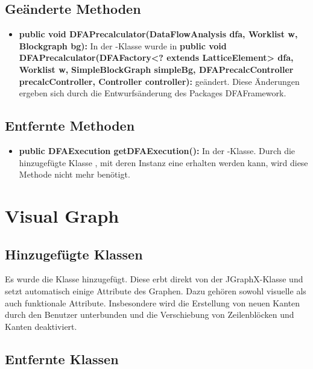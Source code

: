 \newpage
\subsection{Geänderte Methoden}

\begin{itemize}
	\item \textbf{public void DFAPrecalculator(DataFlowAnalysis dfa, Worklist w, Blockgraph bg):} In der -Klasse wurde in \textbf{public void DFAPrecalculator(DFAFactory<? extends LatticeElement> dfa, Worklist w, }\textbf{SimpleBlockGraph simpleBg, DFAPrecalcController precalcController, Controller controller):} geändert. Diese Änderungen ergeben sich durch die Entwurfsänderung des Packages DFAFramework.
\end{itemize}


\subsection{Entfernte Methoden}

\begin{itemize}
	\item \textbf{public DFAExecution getDFAExecution():} In der -Klasse. Durch die hinzugefügte Klasse , mit deren Instanz eine  erhalten werden kann, wird diese Methode nicht mehr benötigt.
\end{itemize}

\newpage
\section{Visual Graph}

\subsection{Hinzugefügte Klassen}

Es wurde die Klasse  hinzugefügt. Diese erbt direkt von der JGraphX-Klasse  und setzt automatisch einige Attribute des Graphen.
Dazu gehören sowohl visuelle als auch funktionale Attribute. Insbesondere wird die Erstellung von neuen Kanten durch den Benutzer unterbunden und die Verschiebung von Zeilenblöcken und Kanten deaktiviert.

\subsection{Entfernte Klassen}

